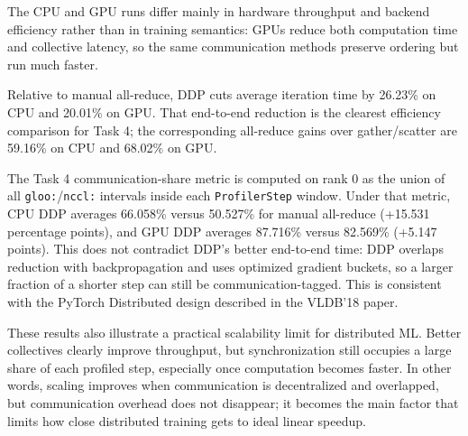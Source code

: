 \documentclass[11pt]{article}
\begin{document}
The CPU and GPU runs differ mainly in hardware throughput and backend efficiency rather than in training semantics: GPUs reduce both computation time and collective latency, so the same communication methods preserve ordering but run much faster.

Relative to manual all-reduce, DDP cuts average iteration time by 26.23\% on CPU and 20.01\% on GPU. That end-to-end reduction is the clearest efficiency comparison for Task 4; the corresponding all-reduce gains over gather/scatter are 59.16\% on CPU and 68.02\% on GPU.

The Task 4 communication-share metric is computed on rank 0 as the union of all \texttt{gloo:}/\texttt{nccl:} intervals inside each \texttt{ProfilerStep} window. Under that metric, CPU DDP averages 66.058\% versus 50.527\% for manual all-reduce (+15.531 percentage points), and GPU DDP averages 87.716\% versus 82.569\% (+5.147 points). This does not contradict DDP's better end-to-end time: DDP overlaps reduction with backpropagation and uses optimized gradient buckets, so a larger fraction of a shorter step can still be communication-tagged. This is consistent with the PyTorch Distributed design described in the VLDB'18 paper.

These results also illustrate a practical scalability limit for distributed ML. Better collectives clearly improve throughput, but synchronization still occupies a large share of each profiled step, especially once computation becomes faster. In other words, scaling improves when communication is decentralized and overlapped, but communication overhead does not disappear; it becomes the main factor that limits how close distributed training gets to ideal linear speedup.
\end{document}
